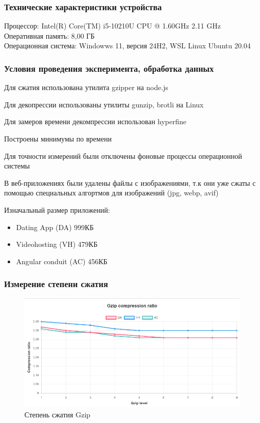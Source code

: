 \documentclass[12pt]{article}
\begin{document}
\subsubsection{Технические характеристики устройства}

Процессор: Intel(R) Core(TM) i5-10210U CPU @ 1.60GHz 2.11 GHz\\
Оперативная память: 8,00 ГБ\\
Операционная система: Windowws 11, версия 24H2, WSL Linux Ubuntu 20.04

\subsubsection{Условия проведения эксперимента, обработка данных}

Для сжатия использована утилита gzipper на node.js

Для декопрессии использованы утилиты gunzip, brotli на Linux

Для замеров времени декомпрессии использован hyperfine

Построены минимумы по времени

Для точности измерений были отключены фоновые процессы операционной системы

В веб-приложениях были удалены файлы с изображениями, т.к они уже сжаты с помощью специальных алгортмов для изображений (jpg, webp, avif)

Изначальный размер приложений:

\begin{itemize}
    \item Dating App (DA) 999КБ
    \item Videohosting (VH) 479КБ
    \item Angular conduit (AC) 456КБ
\end{itemize}

\subsubsection{Измерение степени сжатия}

\begin{figure}[H]
    \centering
    \includegraphics[width=1\textwidth]{../images/gzip_compress_ratio.png}
    \caption{Степень сжатия Gzip}
\end{figure}
\end{document}
